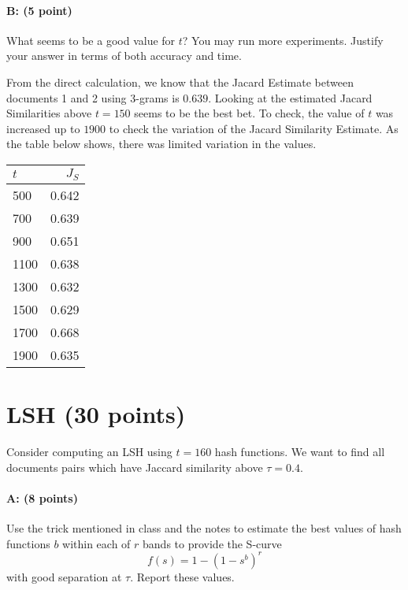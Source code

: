 \documentclass[11pt]{article}
\begin{document}
\paragraph{B: (5 point)}  What seems to be a good value for $t$?  You may run more experiments.  Justify your answer in terms of both accuracy and time.  

From the direct calculation, we know that the Jacard Estimate between documents 1 and 2 using 3-grams is $0.639$. Looking at the estimated Jacard Similarities above $t = 150$ seems to be the best bet. To check, the value of $t$ was increased up to $1900$ to check the variation of the Jacard Similarity Estimate. As the table below shows, there was limited variation in the values.

\begin{table}[H]
\centering
\begin{tabular}{lr}
\hline\hline
$t$ & $J_{S}$\\
\hline
500 & 0.642\\
700 & 0.639\\
900 & 0.651\\
1100 & 0.638\\
1300 & 0.632\\
1500 & 0.629\\
1700 & 0.668\\
1900 & 0.635\\
\hline
\end{tabular}
\end{table}



\section{LSH (30 points)}

Consider computing an LSH using $t = 160$ hash functions.  We want to find all documents pairs which have Jaccard similarity above $\tau = 0.4$.  

\paragraph{A: (8 points)} 
Use the trick mentioned in class and the notes to estimate the best values of hash functions $b$ within each of $r$ bands to provide the S-curve 
\[
f(s) = 1- (1-s^b)^r
\]
with good separation at $\tau$.  Report these values.  
\end{document}

